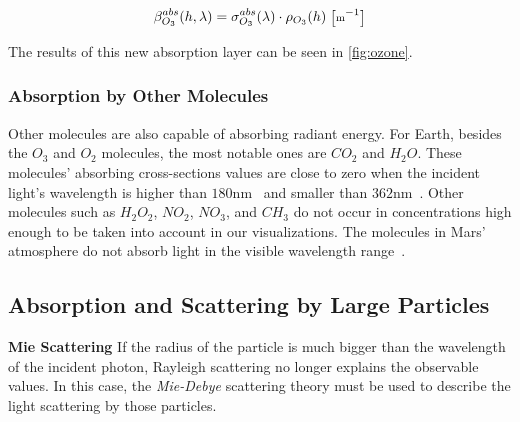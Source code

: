 \documentclass[journal]{vgtc}                %
\begin{document}
\vspace*{-2mm}
\begin{equation} \label{eq:beta-ozone}
  \small
  \beta^{abs}_{O_3}(h, \lambda) = \sigma^{abs}_{O_3}(\lambda) \cdot \rho_{O_3}(h)\ \big[\text{m}^{-1}\big]
\end{equation}

The results of this new absorption layer can be seen in \autoref{fig:ozone}.

\vspace*{-2mm}
\subsubsection{Absorption by Other Molecules}


Other molecules are also capable of absorbing radiant energy. For Earth, besides the $O_3$ and $O_2$ molecules, the most notable ones are $CO_2$ and $H_2O$. These molecules' absorbing cross-sections values are close to zero when the incident light's wavelength is higher than $180\text{nm}$~\cite{Shemansky:1972} and smaller than $362\text{nm}$~\cite{Lampel:2015}. Other molecules such as $H_2O_2$, $NO_2$, $NO_3$, and $CH_3$ do not occur in concentrations high enough to be taken into account in our visualizations. The molecules in Mars' atmosphere do not absorb light in the visible wavelength range~\cite{Haberle:2017}. 


\subsection{Absorption and Scattering by Large Particles}

\noindent \textbf{Mie Scattering} \quad If the radius of the particle is much bigger than the wavelength of the incident photon, Rayleigh scattering no longer explains the observable values. In this case, the \textit{Mie-Debye} scattering theory must be used to describe the light scattering by those particles. 
\end{document}
